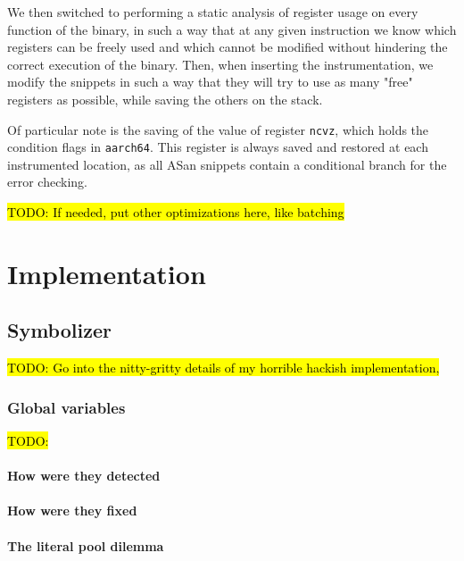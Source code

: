 \documentclass[a4paper,11pt,oneside]{report}
\newcommand{\todo}[1]{%
	\begingroup 
	\sethlcolor{cyan}%
	\hl{TODO: #1}%
	\endgroup
}
\begin{document}
We then switched to performing a static analysis of register usage on every 
function of the binary, in such a way that at any given instruction we know 
which registers can be freely used and which cannot be modified without 
hindering the correct execution of the binary. Then, when inserting the 
instrumentation, we modify the snippets in such a way that they will try to use 
as many "free" registers as possible, while saving the others on the stack.

Of particular note is the saving of the value of register \texttt{ncvz}, which 
holds the condition flags in \texttt{aarch64}. This register is always saved 
and restored at each instrumented location, as all ASan snippets contain a 
conditional branch for the error checking. 

\todo{If needed, put other optimizations here, like batching}



\chapter{Implementation}



\section{Symbolizer}
\todo{Go into the nitty-gritty details of my horrible hackish implementation, }

\subsection{Global variables}
\todo{}
\subsubsection{How were they detected}
\subsubsection{How were they fixed}
\subsubsection{The literal pool dilemma}
\end{document}
